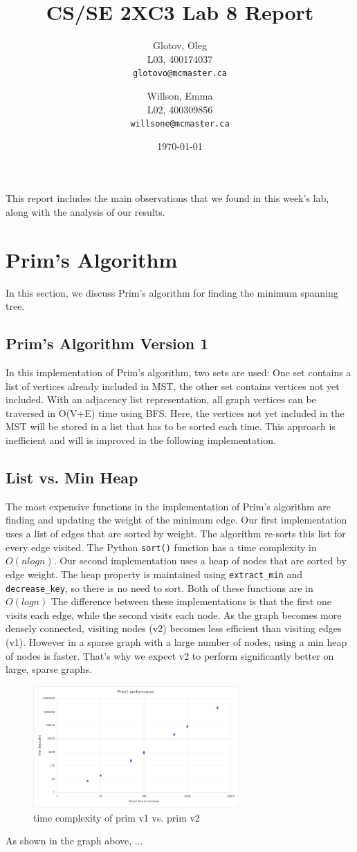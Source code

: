 \documentclass[12pt]{article}
\title{CS/SE 2XC3 Lab 8 Report}
\author{
  Glotov, Oleg\\ L03, 400174037\\
  \texttt{glotovo@mcmaster.ca}
  \and
  Willson, Emma\\ L02, 400309856\\
  \texttt{willsone@mcmaster.ca}
  }
\date{\today}
\begin{document}
\maketitle

This report includes the main observations that we found in this week's lab, along with the analysis of our results.

\newpage 
\section{Prim's Algorithm}
In this section, we discuss Prim's algorithm for finding the minimum spanning tree. 
\subsection{Prim's Algorithm Version 1}
In this implementation of Prim’s algorithm, two sets are used: One set contains a list of vertices already included in MST, the other set contains vertices not yet included. With an adjacency list representation, all graph vertices can be traversed in O(V+E) time using BFS. Here, the vertices not yet included in the MST will be stored in a list that has to be sorted each time. This approach is inefficient and will is improved in the following implementation.
\subsection{List vs. Min Heap}
The most expensive functions in the implementation of Prim's algorithm are finding and updating the weight of the minimum edge. Our first implementation uses a list of edges that are sorted by weight. The algorithm re-sorts this list for every edge visited. The Python \verb+sort()+ function has a time complexity in $O(nlogn)$. Our second implementation uses a heap of nodes that are sorted by edge weight. The heap property is maintained using \verb+extract_min+ and \verb+decrease_key+, so there is no need to sort. Both of these functions are in $O(logn)$ The difference between these implementations is that the first one visits each edge, while the second visits each node. As the graph becomes more densely connected, visiting nodes (v2) becomes less efficient than visiting edges (v1). However in a sparse graph with a large number of nodes, using a min heap of nodes is faster. That's why we expect v2 to perform significantly better on large, sparse graphs.
\begin{figure}[H]
\centering
\includegraphics[width=0.7\textwidth,height=\textheight,keepaspectratio]{prim1.png}
\caption{time complexity of prim v1 vs. prim v2}
\label{Figure: m1}
\end{figure}
\noindent As shown in the graph above, ... 
\end{document}
